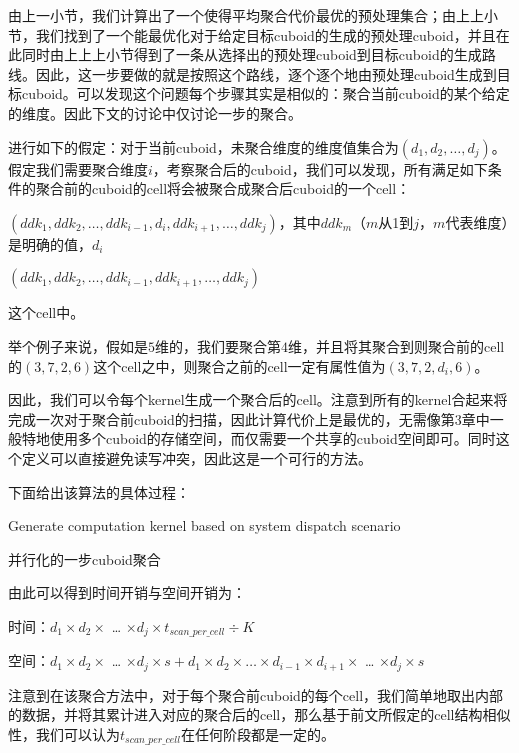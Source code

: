 由上一小节，我们计算出了一个使得平均聚合代价最优的预处理集合；由上上小节，我们找到了一个能最优化对于给定目标cuboid的生成的预处理cuboid，并且在此同时由上上上小节得到了一条从选择出的预处理cuboid到目标cuboid的生成路线。因此，这一步要做的就是按照这个路线，逐个逐个地由预处理cuboid生成到目标cuboid。可以发现这个问题每个步骤其实是相似的：聚合当前cuboid的某个给定的维度。因此下文的讨论中仅讨论一步的聚合。

进行如下的假定：对于当前cuboid，未聚合维度的维度值集合为$(d_1, d_2, …, d_j)$。假定我们需要聚合维度$i$，考察聚合后的cuboid，我们可以发现，所有满足如下条件的聚合前的cuboid的cell将会被聚合成聚合后cuboid的一个cell：

$(ddk_1, ddk_2, …, ddk_{i-1}, d_i, ddk_{i+1}, …, ddk_j)$，其中$ddk_m$（$m$从1到$j$，$m$代表维度）是明确的值，$d_i$

$(ddk_1, ddk_2, …, ddk_{i-1}, ddk_{i+1}, …, ddk_j)$

这个cell中。

举个例子来说，假如是$5$维的，我们要聚合第$4$维，并且将其聚合到则聚合前的cell的$(3, 7, 2, 6)$这个cell之中，则聚合之前的cell一定有属性值为$(3, 7, 2, d_i, 6)$。

因此，我们可以令每个kernel生成一个聚合后的cell。注意到所有的kernel合起来将完成一次对于聚合前cuboid的扫描，因此计算代价上是最优的，无需像第3章中一般特地使用多个cuboid的存储空间，而仅需要一个共享的cuboid空间即可。同时这个定义可以直接避免读写冲突，因此这是一个可行的方法。

下面给出该算法的具体过程：
\begin{algorithm}[htbp]
\SetAlgoLined
{}
Generate computation kernel based on system dispatch scenario\;
\caption{并行化的一步cuboid聚合}
\label{algo:algorithm6}
\end{algorithm}

由此可以得到时间开销与空间开销为：

时间：$d_1 \times d_2 \times$ … $\times d_j \times t_{scan\_per\_cell} \div K$

空间：$d_1 \times d_2 \times$ … $\times d_j \times s + d_1 \times d_2 \times … \times d_{i-1} \times d_{i+1} \times$ … $\times d_j \times s$

注意到在该聚合方法中，对于每个聚合前cuboid的每个cell，我们简单地取出内部的数据，并将其累计进入对应的聚合后的cell，那么基于前文所假定的cell结构相似性，我们可以认为$t_{scan\_per\_cell}$在任何阶段都是一定的。
